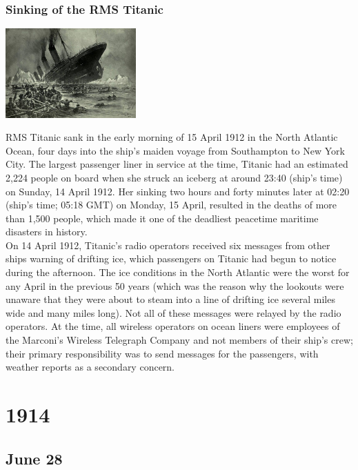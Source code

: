 \documentclass[11pt]{report}
\begin{document}
\subsection{Sinking of the RMS Titanic}
\vspace{2mm}\begin{center}\includegraphics[width=5cm]{./img/titanicsinking.jpg}\end{center}
RMS Titanic sank in the early morning of 15 April 1912 in the North Atlantic Ocean, four days into the ship's maiden voyage from Southampton to New York City. The largest passenger liner in service at the time, Titanic had an estimated 2,224 people on board when she struck an iceberg at around 23:40 (ship's time) on Sunday, 14 April 1912. Her sinking two hours and forty minutes later at 02:20 (ship's time; 05:18 GMT) on Monday, 15 April, resulted in the deaths of more than 1,500 people, which made it one of the deadliest peacetime maritime disasters in history.\\
On 14 April 1912, Titanic's radio operators received six messages from other ships warning of drifting ice, which passengers on Titanic had begun to notice during the afternoon. The ice conditions in the North Atlantic were the worst for any April in the previous 50 years (which was the reason why the lookouts were unaware that they were about to steam into a line of drifting ice several miles wide and many miles long). Not all of these messages were relayed by the radio operators. At the time, all wireless operators on ocean liners were employees of the Marconi's Wireless Telegraph Company and not members of their ship's crew; their primary responsibility was to send messages for the passengers, with weather reports as a secondary concern.

\chapter{1914}
\section{June 28}
\end{document}
